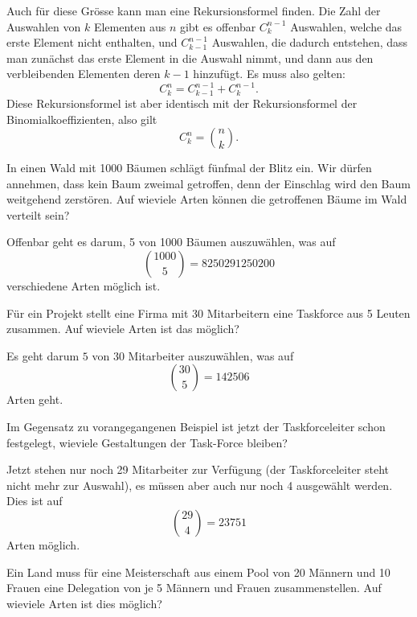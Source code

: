Auch für diese Grösse kann man eine Rekursionsformel finden.
Die Zahl der Auswahlen von $k$ Elementen aus $n$ gibt es
offenbar $C^{n-1}_{k}$ Auswahlen, welche das erste Element nicht
enthalten, und $C^{n-1}_{k-1}$ Auswahlen, die dadurch entstehen,
dass man zunächst das erste Element in die Auswahl nimmt, und dann
aus den verbleibenden Elementen deren $k-1$ hinzufügt.
Es muss also
gelten:
\[
C^n_k=C^{n-1}_{k-1}+C^{n-1}_{k}.
\]
Diese Rekursionsformel ist aber identisch mit der Rekursionsformel
der Binomialkoeffizienten, also gilt
\[
C^n_k=\binom{n}{k}.
\]

\begin{beispiele}
\item In einen Wald mit 1000 Bäumen schlägt fünfmal der Blitz ein.
Wir dürfen annehmen, dass kein Baum zweimal getroffen, denn der
Einschlag wird den Baum weitgehend zerstören.
Auf wieviele Arten
können die getroffenen Bäume im Wald verteilt sein?

\begin{loesung}
Offenbar geht es darum, 5 von 1000 Bäumen auszuwählen, was 
auf
\[
\binom{1000}{5}=8250291250200
\]
verschiedene Arten möglich ist.
\end{loesung}

\item Für ein Projekt stellt eine Firma mit 30 Mitarbeitern eine Taskforce
aus 5 Leuten zusammen.
Auf wieviele Arten ist das möglich?


\begin{loesung}
Es geht darum $5$ von $30$ Mitarbeiter auszuwählen, was auf
\[
\binom{30}{5}=142506
\]
Arten geht.
\end{loesung}

\item Im Gegensatz zu vorangegangenen Beispiel ist jetzt der
Taskforceleiter schon festgelegt, wieviele Gestaltungen der
Task-Force bleiben?

\begin{loesung}
Jetzt stehen nur noch 29 Mitarbeiter zur Verfügung (der Taskforceleiter
steht nicht mehr zur Auswahl), es müssen aber auch nur noch 4 ausgewählt
werden.
Dies ist auf
\[
\binom{29}{4}=23751
\]
Arten möglich.
\end{loesung}

\item\label{meisterschaft}
Ein Land muss für eine Meisterschaft aus einem Pool von
20 Männern und 10 Frauen eine Delegation von je 5 Männern
und Frauen zusammenstellen.
Auf wieviele Arten ist dies möglich?


\end{beispiele}
